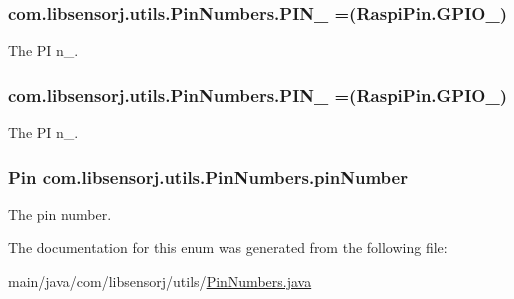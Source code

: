 \subsubsection[{P\+I\+N\+\_\+28}]{\setlength{\rightskip}{0pt plus 5cm}com.\+libsensorj.\+utils.\+Pin\+Numbers.\+P\+I\+N\+\_ =(Raspi\+Pin.\+G\+P\+I\+O\+\_)}\label{enumcom_1_1libsensorj_1_1utils_1_1PinNumbers_af7bec7611fed7e9b64e25485f2378f81}
The P\+I n\+\_. \hypertarget{enumcom_1_1libsensorj_1_1utils_1_1PinNumbers_a78cc24e6c72e7dceb4a9a152cc9da41f}{}
\subsubsection[{P\+I\+N\+\_\+29}]{\setlength{\rightskip}{0pt plus 5cm}com.\+libsensorj.\+utils.\+Pin\+Numbers.\+P\+I\+N\+\_ =(Raspi\+Pin.\+G\+P\+I\+O\+\_)}\label{enumcom_1_1libsensorj_1_1utils_1_1PinNumbers_a78cc24e6c72e7dceb4a9a152cc9da41f}
The P\+I n\+\_. \hypertarget{enumcom_1_1libsensorj_1_1utils_1_1PinNumbers_a82cad4bc9bde38b8b6e9f33f5ce8bf3d}{}
\subsubsection[{pin\+Number}]{\setlength{\rightskip}{0pt plus 5cm}Pin com.\+libsensorj.\+utils.\+Pin\+Numbers.\+pin\+Number\hspace{0.3cm}{\ttfamily [private]}}\label{enumcom_1_1libsensorj_1_1utils_1_1PinNumbers_a82cad4bc9bde38b8b6e9f33f5ce8bf3d}
The pin number. 

The documentation for this enum was generated from the following file\+:\begin{DoxyCompactItemize}
\item 
main/java/com/libsensorj/utils/\hyperlink{PinNumbers_8java}{Pin\+Numbers.\+java}\end{DoxyCompactItemize}
